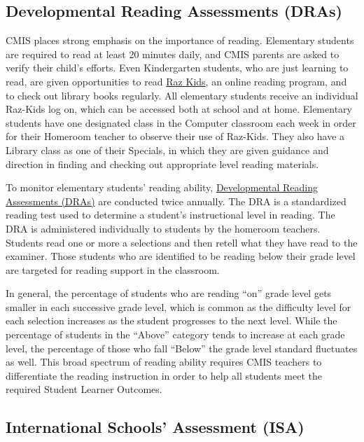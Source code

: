 \subsection{Developmental Reading Assessments (DRAs)}

CMIS places strong emphasis on the importance of reading.  Elementary students are required to read at least 20 minutes daily, and CMIS parents are asked to verify their child’s efforts.  Even Kindergarten students, who are just learning to read, are given opportunities to read \href{https://www.raz-kids.com/}{Raz Kids}, an online reading program, and to check out library books regularly.  All elementary students receive an individual Raz-Kids log on, which can be accessed both at school and at home.  Elementary students have one designated class in the Computer classroom each week in order for their Homeroom teacher to observe their use of Raz-Kids.  They also have a Library class as one of their Specials, in which they are given guidance and direction in finding and checking out appropriate level reading materials.  

To monitor elementary students’ reading ability, \href{https://drive.google.com/open?id=0ByVFfrm0zfolV29lcmM1WXVQOXc}{Developmental Reading Assessments (DRAs)} are conducted twice annually.  The DRA is a standardized reading test used to determine a student’s instructional level in reading. The DRA is administered individually to students by the homeroom teachers. Students read one or more a selections and then retell what they have read to the examiner. Those students who are identified to be reading below their grade level are targeted for reading support in the classroom. 

In general, the percentage of students who are reading “on” grade level gets smaller in each successive grade level, which is common as the difficulty level for each selection increases as the student progresses to the next level. While the percentage of students in the “Above” category tends to increase at each grade level, the percentage of those who fall “Below” the grade level standard fluctuates as well. This broad spectrum of reading ability requires CMIS teachers to differentiate the reading instruction in order to help all students meet the required Student Learner Outcomes.  

 

\subsection{International Schools’ Assessment (ISA)}

